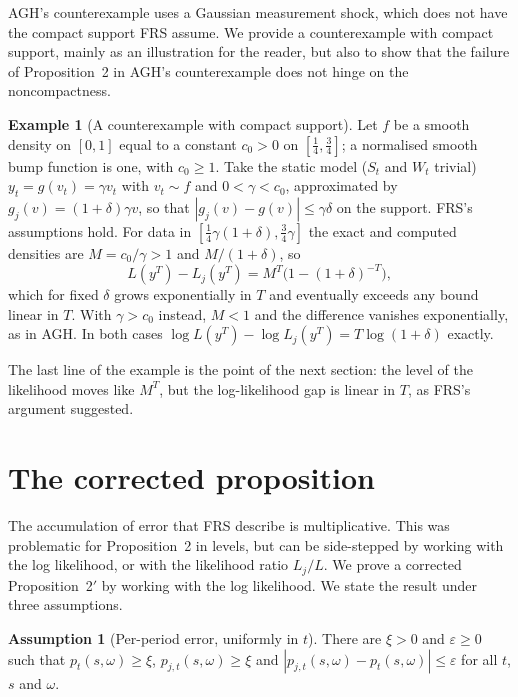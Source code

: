 \documentclass[11pt]{article}
\theoremstyle{definition}
\newtheorem{assumption}{Assumption}
\newtheorem{example}[theorem]{Example}
\theoremstyle{remark}
\begin{document}
AGH's counterexample uses a Gaussian measurement shock, which does not have the compact support
FRS assume. We provide a counterexample with compact support, mainly as an illustration for the
reader, but also to show that the failure of Proposition~2 in AGH's counterexample does not hinge
on the noncompactness.

\begin{example}[A counterexample with compact support]\label{ex:compact}
Let $f$ be a smooth density on $[0,1]$ equal to a constant $c_0 > 0$ on $[\frac14,\frac34]$; a
normalised smooth bump function is one, with $c_0 \ge 1$. Take
the static model ($S_t$ and $W_t$ trivial) $y_t = g(v_t) = \gamma v_t$ with $v_t \sim f$ and
$0 < \gamma < c_0$, approximated by $g_j(v) = (1+\delta)\gamma v$, so that
$|g_j(v) - g(v)| \le \gamma\delta$ on the support. FRS's assumptions hold. For data in
$[\frac14\gamma(1+\delta), \frac34\gamma]$ the exact and computed densities are $M = c_0/\gamma > 1$
and $M/(1+\delta)$, so
\[
  L(y^T) - L_j(y^T) = M^T\bigl(1 - (1+\delta)^{-T}\bigr),
\]
which for fixed $\delta$ grows exponentially in $T$ and eventually exceeds any bound linear in
$T$. With $\gamma > c_0$ instead, $M < 1$ and the difference vanishes exponentially, as in AGH.
In both cases $\log L(y^T) - \log L_j(y^T) = T\log(1+\delta)$ exactly.
\end{example}

The last line of the example is the point of the next section: the level of the likelihood moves
like $M^T$, but the log-likelihood gap is linear in $T$, as FRS's argument suggested.

\section{The corrected proposition}\label{sec:main}

The accumulation of error that FRS describe is multiplicative. This was problematic for
Proposition~2 in levels, but can be side-stepped by working with the log likelihood, or with the
likelihood ratio $L_j/L$. We prove a corrected Proposition~2$'$ by working with the log
likelihood. We state the result under
three assumptions.

\begin{assumption}[Per-period error, uniformly in $t$]\label{a:err}
There are $\xi > 0$ and $\varepsilon \ge 0$ such that $p_t(s,\omega) \ge \xi$,
$p_{j,t}(s,\omega) \ge \xi$ and $|p_{j,t}(s,\omega) - p_t(s,\omega)| \le \varepsilon$ for all $t$, $s$
and $\omega$.
\end{assumption}
\end{document}
